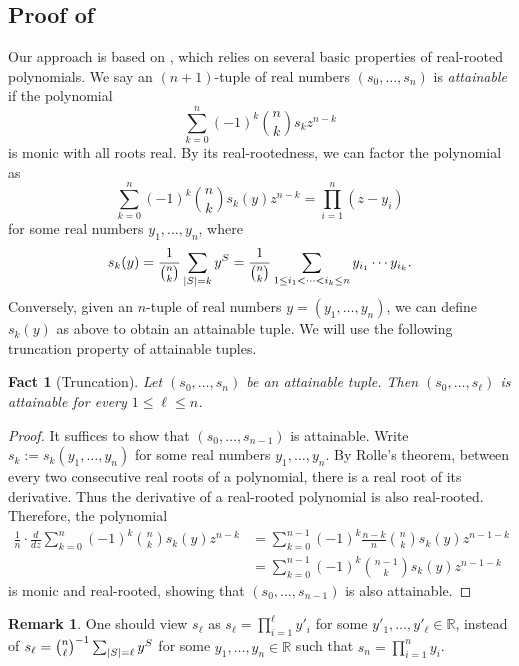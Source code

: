 \documentclass[10pt,a4paper]{article}
\newtheorem{fact}[theorem]{Fact}
\theoremstyle{definition}
\newtheorem{remark}[theorem]{Remark}
\newcommand{\R}{\mathbb R}
\DeclarePairedDelimiter\abs{\lvert}{\rvert}
\begin{document}
\subsection{Proof of }
Our approach is based on \cite{Tao23-Maclaurin}, which relies on several basic properties of real-rooted polynomials.
We say an $(n+1)$-tuple of real numbers $(s_0, \ldots, s_n)$ is \emph{attainable} if the polynomial
\[
  \sum_{k=0}^n (-1)^k \binom{n}{k} s_k z^{n-k}
\]
is monic with all roots real.
By its real-rootedness, we can factor the polynomial as
\[
  \sum_{k=0}^n (-1)^k \binom{n}{k} s_k(y) z^{n-k}
  = \prod_{i=1}^n (z-y_i)
\]
for some real numbers $y_1, \ldots, y_n$, where
\[
  s_k(y)
  = \frac{1}{\binom{n}{k}} \sum_{\abs{S}=k} y^S
  = \frac{1}{\binom{n}{k}} \sum_{1 \le i_1 < \cdots < i_k \le n} y_{i_1} \cdots y_{i_k} .
\]
Conversely, given an $n$-tuple of real numbers $y = (y_1, \ldots, y_n)$, we can define $s_k(y)$ as above to obtain an attainable tuple.
We will use the following truncation property of attainable tuples.

\begin{fact}[Truncation] \label{fact:truncation}
  Let $(s_0, \ldots, s_n)$ be an attainable tuple.
  Then $(s_0, \ldots, s_\ell)$ is attainable for every $1 \le \ell \le n$.
\end{fact}
\begin{proof}
  It suffices to show that $(s_0, \ldots, s_{n-1})$ is attainable.
  Write $s_k := s_k(y_1, \ldots, y_n)$ for some real numbers $y_1, \dots, y_n$.
  By Rolle's theorem, between every two consecutive real roots of a polynomial, there is a real root of its derivative.
  Thus the derivative of a real-rooted polynomial is also real-rooted.
  Therefore, the polynomial
  \begin{align*}
    \frac{1}{n} \cdot \frac{d}{dz} \sum_{k=0}^n (-1)^k \binom{n}{k} s_k(y) z^{n-k}
    &= \sum_{k=0}^{n-1} (-1)^k \frac{n-k}{n} \binom{n}{k} s_k(y) z^{n-1-k} \\
    &= \sum_{k=0}^{n-1} (-1)^k \binom{n-1}{k} s_k(y) z^{n-1-k}
  \end{align*}
  is monic and real-rooted, showing that $(s_0, \ldots, s_{n-1})$ is also attainable.
\end{proof}

\begin{remark}
  One should view $s_\ell$ as $s_\ell = \prod_{i=1}^\ell y'_i$ for some $y'_1, \ldots, y'_\ell \in \R$, instead of $s_\ell = \binom{n}{\ell}^{-1} \sum_{\abs{S}=\ell} y^S$ for some $y_1, \ldots, y_n \in \R$ such that $s_n = \prod_{i=1}^n y_i$.
\end{remark}
\end{document}
